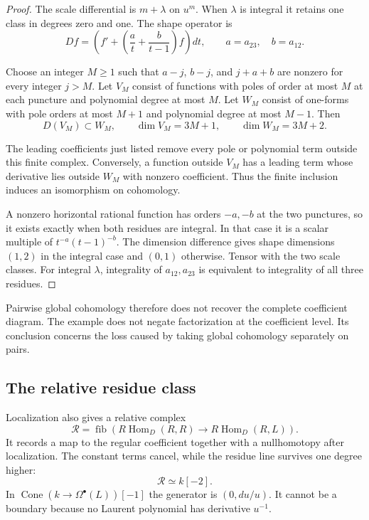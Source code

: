 \begin{proof}
The scale differential is $m+\lambda$ on
$u^m$. When $\lambda$ is integral it retains
one class in degrees zero and one. The shape
operator is
\[
 Df=\left(f'+\left(\frac a t+\frac b{t-1}\right)f\right)dt,
 \qquad a=a_{23},\quad b=a_{12}.
\]

Choose an integer $M\geq1$ such that
$a-j$, $b-j$, and $j+a+b$ are nonzero for
every integer $j>M$. Let $V_M$ consist of
functions with poles of order at most $M$
at each puncture and polynomial degree at
most $M$. Let $W_M$ consist of one-forms
with pole orders at most $M+1$ and
polynomial degree at most $M-1$.
Then
\[
 D(V_M)\subset W_M,\qquad
 \dim V_M=3M+1,\qquad \dim W_M=3M+2.
\]

The leading coefficients just listed remove
every pole or polynomial term outside this
finite complex. Conversely, a function outside
$V_M$ has a leading term whose derivative
lies outside $W_M$ with nonzero coefficient.
Thus the finite inclusion induces an
isomorphism on cohomology.

A nonzero horizontal rational function has
orders $-a,-b$ at the two punctures, so it
exists exactly when both residues are
integral. In that case it is a scalar
multiple of $t^{-a}(t-1)^{-b}$.
The dimension difference gives shape
dimensions $(1,2)$ in the integral case
and $(0,1)$ otherwise. Tensor with the
two scale classes. For integral $\lambda$,
integrality of $a_{12},a_{23}$ is equivalent
to integrality of all three residues.
\end{proof}

Pairwise global cohomology therefore does not
recover the complete coefficient diagram.
The example does not negate factorization
at the coefficient level. Its conclusion
concerns the loss caused by taking global
cohomology separately on pairs.

\subsection{The relative residue class}
\label{v4-arith:centers:subsec:relative-residue}

Localization also gives a relative complex
\[
 \mathcal R=\operatorname{fib}\left(
 R\operatorname{Hom}_D(R,R)\longrightarrow
 R\operatorname{Hom}_D(R,L)\right).
\]
It records a map to the regular coefficient
together with a nullhomotopy after localization.
The constant terms cancel, while the residue
line survives one degree higher:
\[
 \mathcal R\simeq k[-2].
\]
In $\operatorname{Cone}(k\to\Omega^\bullet(L))[-1]$
the generator is $(0,du/u)$. It cannot be a
boundary because no Laurent polynomial
has derivative $u^{-1}$.


